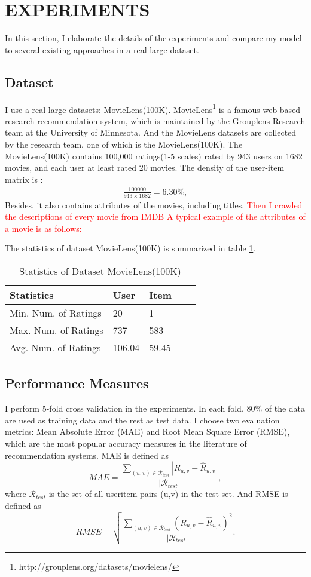 \section{EXPERIMENTS}
In this section, I elaborate the details of the experiments and compare my model to several existing approaches in a real large dataset.
\subsection{Dataset}
I use a real large datasets: MovieLens(100K). MovieLens\footnote{http://grouplens.org/datasets/movielens/} is a famous web-based research recommendation system, which is maintained by the Grouplens Research team at the University of Minnesota. And the MovieLens datasets are collected by the research team, one of which is the MovieLens(100K). The MovieLens(100K) contains 100,000 ratings(1-5 scales) rated by 943 users on 1682 movies, and each user at least rated 20 movies. The density of the user-item matrix is :
\begin{align*}
	\frac{100000}{943 \times 1682} = 6.30\%,
\end{align*}
Besides, it also contains attributes of the movies, including titles. \textcolor{red}{Then I crawled the descriptions of every movie from IMDB A typical example of the attributes of a movie is as follows:
}

The statistics of dataset MovieLens(100K) is summarized in table \ref{stats}.
\begin{table}[]
	\centering
	\caption{Statistics of Dataset MovieLens(100K)}
	\label{stats}
	\begin{tabular}{|l|l|l|l|l|}
		\hline
		Statistics  & User  & Item   \\ \hline
		Min. Num. of Ratings  &20  &1   \\ \hline
		Max. Num. of Ratings  &737  &583  \\ \hline
		Avg. Num. of Ratings  &106.04  &59.45  \\ \hline
	\end{tabular}
\end{table}

\subsection{Performance Measures}
I perform 5-fold cross validation in the experiments. In each fold, 80\% of the data are used as training data and the rest as test data. I choose two evaluation metrics: Mean Absolute Error (MAE) and Root Mean Square Error (RMSE), which are the most popular accuracy measures in the literature of recommendation systems.
MAE is defined as
\begin{equation}
MAE = \frac{\sum_{(u,v) \in \mathcal{R}_{test}}{|R_{u,v} - \hat{R}_{u,v}|}}{|\mathcal{R}_{test}|},
\end{equation} 
where $\mathcal{R}_{test}$ is the set of all user\-item pairs (u,v) in the test set. And RMSE is defined as
\begin{equation}
RMSE = \sqrt{\frac{\sum_{(u,v) \in \mathcal{R}_{test}}{(R_{u,v} - \hat{R}_{u,v})^2}}{|\mathcal{R}_{test}|}}.
\end{equation}
